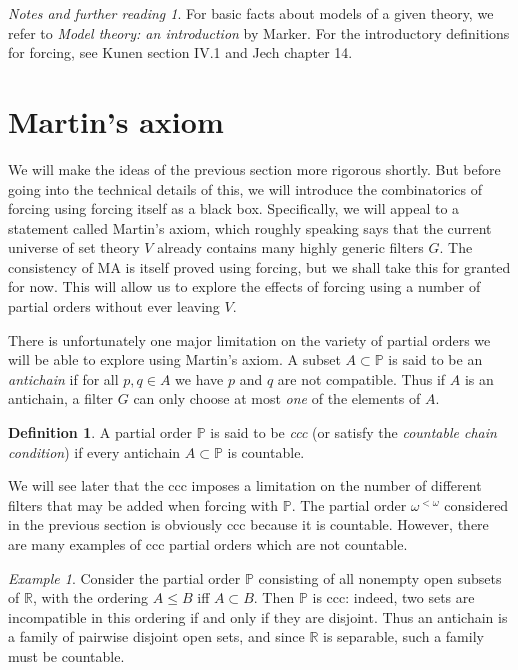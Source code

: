 \documentclass[11pt,oneside]{amsbook}
\newcommand{\R}{\mathbb R}
\newcommand{\PP}{\mathbb P}
\theoremstyle{definition}
\theoremstyle{plain}
\theoremstyle{definition}
\newtheorem{definition}[theorem]{Definition}
\theoremstyle{remark}
\newtheorem{example}[theorem]{Example}
\newtheorem*{notes}{Notes and further reading}
\numberwithin{equation}{section}
\numberwithin{figure}{section}
\begin{document}
\begin{notes}
  For basic facts about models of a given theory, we refer to \emph{Model theory: an introduction} by Marker. For the introductory definitions for forcing, see Kunen section IV.1 and Jech chapter 14.
\end{notes}


\newpage
\section{Martin's axiom}

We will make the ideas of the previous section more rigorous shortly. But before going into the technical details of this, we will introduce the combinatorics of forcing using forcing itself as a black box. Specifically, we will appeal to a statement called Martin's axiom, which roughly speaking says that the current universe of set theory $V$ already contains many highly generic filters $G$. The consistency of MA is itself proved using forcing, but we shall take this for granted for now. This will allow us to explore the effects of forcing using a number of partial orders without ever leaving $V$.

There is unfortunately one major limitation on the variety of partial orders we will be able to explore using Martin's axiom. A subset $A\subset\PP$ is said to be an \emph{antichain} if for all $p,q\in A$ we have $p$ and $q$ are not compatible. Thus if $A$ is an antichain, a filter $G$ can only choose at most \emph{one} of the elements of $A$.

\begin{definition}
  A partial order $\PP$ is said to be \emph{ccc} (or satisfy the \emph{countable chain condition}) if every antichain $A\subset\PP$ is countable.
\end{definition}

We will see later that the ccc imposes a limitation on the number of different filters that may be added when forcing with $\PP$. The partial order $\omega^{<\omega}$ considered in the previous section is obviously ccc because it is countable. However, there are many examples of ccc partial orders which are not countable.

\begin{example}
  \label{ex:cohen-ccc}
  Consider the partial order $\PP$ consisting of all nonempty open subsets of $\R$, with the ordering $A\leq B$ iff $A\subset B$. Then $\PP$ is ccc: indeed, two sets are incompatible in this ordering if and only if they are disjoint. Thus an antichain is a family of pairwise disjoint open sets, and since $\R$ is separable, such a family must be countable.
\end{example}
\end{document}
